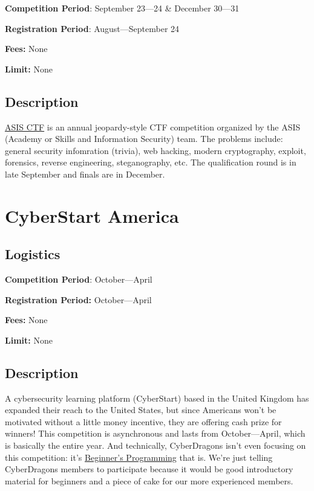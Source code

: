 \documentclass[
  letterpaper,
  DIV=11,
  numbers=noendperiod]{scrartcl}
\begin{document}
\textbf{Competition Period}: September 23---24 \& December 30---31

\textbf{Registration Period}: August---September 24

\textbf{Fees:} None

\textbf{Limit:} None

\hypertarget{description-1}{%
\subsection{Description}\label{description-1}}

\href{https://asisctf.com/}{ASIS CTF} is an annual jeopardy-style CTF
competition organized by the ASIS (Academy or Skills and Information
Security) team. The problems include: general security infomration
(trivia), web hacking, modern cryptography, exploit, forensics, reverse
engineering, steganography, etc. The qualification round is in late
September and finals are in December.

\hypertarget{cyberstart-america}{%
\section{CyberStart America}\label{cyberstart-america}}

\hypertarget{logistics-2}{%
\subsection{Logistics}\label{logistics-2}}

\textbf{Competition Period}: October---April

\textbf{Registration Period:} October---April

\textbf{Fees:} None

\textbf{Limit:} None

\hypertarget{description-2}{%
\subsection{Description}\label{description-2}}

A cybersecurity learning platform (CyberStart) based in the United
Kingdom has expanded their reach to the United States, but since
Americans won't be motivated without a little money incentive, they are
offering cash prize for winners! This competition is asynchronous and
lasts from October---April, which is basically the entire year. And
technically, CyberDragons isn't even focusing on this competition: it's
\href{https://docs.google.com/document/d/17gccH6BFHdis-tRGBOMymy97Gh0RO_vw79blIst_hi4/edit?usp=sharing}{Beginner's
Programming} that is. We're just telling CyberDragons members to
participate because it would be good introductory material for beginners
and a piece of cake for our more experienced members.
\end{document}
